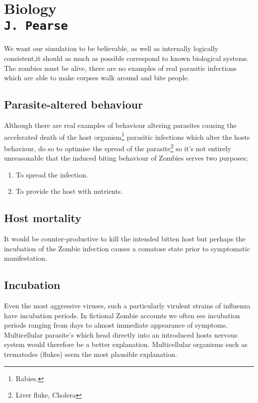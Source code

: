 \pagestyle{empty}

\section{Biology\\{\small\tt{J.~Pearse}}}
We want our simulation to be believable, as well as internally logically consistent,it should as much as possible correspond to known biological systems. The zombies must be alive, there are no examples of real parasitic infections which are able to make corpses walk around and bite people.

\subsection{Parasite-altered behaviour}
Although there are real examples of behaviour altering parasites causing the accelerated death of the host organism\footnote{Rabies.} parasitic infections which alter the hosts behaviour, do so to optimise the spread of the parasite\footnote{Liver fluke, Cholera} so it's not entirely unreasonable that the induced biting behaviour of Zombies serves two purposes;
\begin{enumerate}
\item To spread the infection.
\item To provide the host with nutrients.
\end{enumerate}

\subsection{Host mortality}
It would be counter-productive to kill the intended bitten host but perhaps the incubation of the Zombie infection causes a comatose state prior to symptomatic manifestation.

\subsection{Incubation}
Even the most aggressive viruses, such a particularly virulent strains of influenza have incubation periods. In fictional Zombie accounts we often see incubation periods ranging from days to almost immediate appearance of symptoms. Multicellular parasite's which head directly into an introduced hosts nervous system would therefore be a better explanation. Multicellular organisms such as trematodes (flukes) seem the most plausible explanation.

